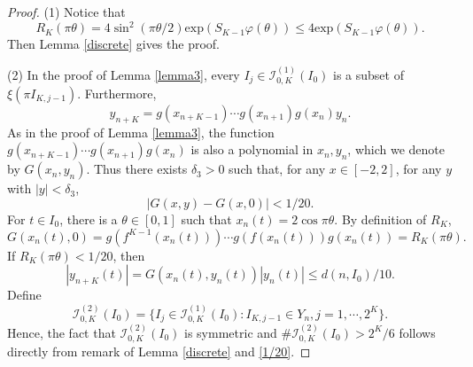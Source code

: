 \documentclass[10pt,a4paper]{amsart}
\begin{document}
\begin{proof}
(1) Notice that 
\begin{equation*}
R_K(\pi\theta)=4\sin^2{(\pi\theta/2)}\mathrm{exp}(S_{K-1}\varphi(\theta))\le 4\mathrm{exp}(S_{K-1}\varphi(\theta)).
\end{equation*}
Then Lemma \ref{discrete} gives the proof.


(2) In the proof of Lemma \ref{lemma3},  
every $I_j\in \mathcal{I}_{0,K}^{(1)}(I_0)$ is a subset of $\xi(\pi I_{K,j-1})$.
     Furthermore, 
\begin{equation*}
    y_{n+K}= g(x_{n+K-1})\cdots g(x_{n+1})g(x_n)y_n.
    \end{equation*}
As in the proof of Lemma \ref{lemma3}, the function $g(x_{n+K-1})\cdots g(x_{n+1})g(x_n)$ is also
a polynomial in $x_n, y_n$, which we denote by $G(x_n,y_n)$. 
Thus there exists $\delta_3>0$ such that, for any $x\in [-2,2]$, 
for any $y$ with $|y|<\delta_{3}$, 
\begin{equation*}
|G(x,y)-G(x,0)|<1/20.
\end{equation*}
For $t\in I_0$, there is a $\theta\in[0,1]$ such that $x_n(t)=2\cos\pi\theta$.  By definition of $R_K$,
\begin{equation*}
G(x_n(t),0)=g(f^{K-1}(x_n(t)))\cdots g(f(x_n(t)))g(x_n(t))=R_{K}(\pi\theta).
\end{equation*}
If $R_K(\pi\theta)<1/20$, then
\begin{equation*}
|y_{n+K}(t)|=G(x_n(t),y_n(t))|y_n(t)|\le d(n,I_0)/10.
\end{equation*}
Define 
$$\mathcal{I}_{0,K}^{(2)}(I_0)=\{I_j\in\mathcal{I}_{0,K}^{(1)}(I_0) : 
I_{K,j-1}\in Y_n, j=1,\cdots, 2^K\}.$$
Hence, the fact that $\mathcal{I}_{0,K}^{(2)}(I_0)$ is symmetric and $\#\mathcal{I}_{0,K}^{(2)}(I_0)>2^K/6$ follows directly from remark of Lemma \ref{discrete} and  \eqref{1/20}.
\end{proof}
\end{document}
